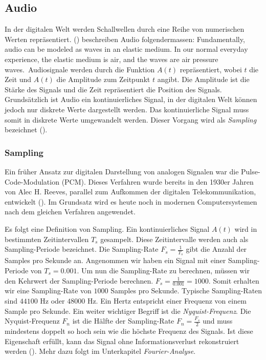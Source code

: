 \documentclass[11pt,a4paper]{article}
\begin{document}
\subsection{Audio}
In der digitalen Welt werden Schallwellen durch eine Reihe von numerischen Werten
repräsentiert. (\cite[p.9]{somberg2019audioapi}) beschreiben Audio folgendermassen: \glqq Fundamentally,
audio can be modeled as waves in an elastic medium. In our normal everyday experience, the elastic
medium is air, and the waves are air pressure waves.\grqq \ Audiosignale werden durch die Funktion
\(A(t)\) repräsentiert, wobei \(t\) die Zeit und \(A(t)\) die Amplitude zum
Zeitpunkt \(t\) angibt. Die Amplitude ist die Stärke des Signals und die Zeit repräsentiert die
Position des Signals. Grundsätzlich ist Audio ein kontinuierliches Signal, in der digitalen Welt 
können jedoch nur diskrete Werte dargestellt werden. Das kontinuierliche Signal muss somit in 
diskrete Werte umgewandelt werden. Dieser Vorgang wird als \textit{Sampling} bezeichnet 
(\cite[Chapter~3.1]{tarr2018hackaudio}). 


\subsubsection{Sampling}
Ein früher Ansatz zur digitalen Darstellung von analogen Signalen war die Pulse-Code-Modulation
(PCM). Dieses Verfahren wurde bereits in den 1930er Jahren von Alec H. Reeves, parallel zum 
Aufkommen der digitalen Telekommunikation, entwickelt (\cite[p.~57]{deloraine1965pcm}). Im Grundsatz 
wird es heute noch in modernen Computersystemen nach dem gleichen Verfahren angewendet.

\noindent \newline
Es folgt eine Definition von Sampling. Ein kontinuierliches Signal \(A(t)\)
wird in bestimmten Zeitintervallen \(T_s\) gesampelt. Diese Zeitintervalle werden auch als
Sampling-Periode bezeichnet. Die Sampling-Rate \(F_s = \displaystyle\frac{1}{T_s}\) gibt die Anzahl
der Samples pro Sekunde an. Angenommen wir haben ein Signal mit einer Sampling-Periode
von \(T_s = 0.001\). Um nun die Sampling-Rate zu berechnen, müssen wir den Kehrwert der
Sampling-Periode berechnen. \(F_s = \displaystyle\frac{1}{0.001} = 1000\). Somit erhalten wir eine
Sampling-Rate von \(1000\) Samples pro Sekunde. Typische Sampling-Raten sind \(44100\) Hz
oder \(48000\) Hz. Ein Hertz entspricht einer Frequenz von einem Sample pro Sekunde. 
Ein weiter wichtiger Begriff ist die \textit{Nyquist-Frequenz}. Die Nyquist-Frequenz \(F_n\) ist 
die Hälfte der Sampling-Rate \(F_n = \displaystyle\frac{F_s}{2}\) und muss mindestens doppelt so 
hoch sein wie die höchste Frequenz des Signals. Ist diese Eigenschaft erfüllt, kann das 
Signal ohne Informationsverlust rekonstruiert werden (\cite[Chapter~3.1]{tarr2018hackaudio}). 
Mehr dazu folgt im Unterkapitel \textit{Fourier-Analyse}.
\end{document}
